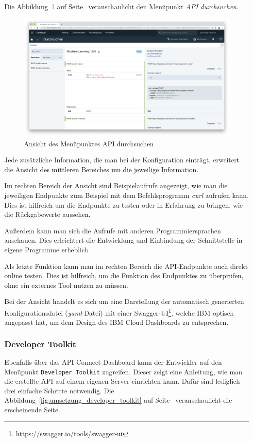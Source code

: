 Die Abbildung~\ref{fig:umsetzung_apiconnect_durchsuchen} auf Seite~\pageref{fig:umsetzung_apiconnect_durchsuchen}
veranschaulicht den Menüpunkt \textit{API durchsuchen}.

\begin{figure}[h]
    \centering
    \includegraphics[width=\textwidth]{images/kapitel_3/apiconnect_durchsuchen.png}
    \caption{Ansicht des Menüpunktes API durchsuchen}
    \label{fig:umsetzung_apiconnect_durchsuchen}
\end{figure}

Jede zusätzliche Information, die man bei der Konfiguration einträgt, erweitert die Ansicht des mittleren Bereiches
um die jeweilige Information.

Im rechten Bereich der Ansicht sind Beispielaufrufe angezeigt, wie man die jeweiligen Endpunkte zum Beispiel mit dem
Befehlsprogramm \textit{curl} aufrufen kann. Dies ist hilfreich um die Endpunkte zu testen oder in Erfahrung zu bringen,
wie die Rückgabewerte aussehen.

Außerdem kann man sich die Aufrufe mit anderen Programmiersprachen anschauen. Dies erleichtert die Entwicklung und
Einbindung der Schnittstelle in eigene Programme erheblich.

Als letzte Funktion kann man im rechten Bereich die API-Endpunkte auch direkt online testen. Dies ist hilfreich, um die
Funktion des Endpunktes zu überprüfen, ohne ein externes Tool nutzen zu müssen.

Bei der Ansicht handelt es sich um eine Darstellung der automatisch generierten Konfigurationsdatei
(\textit{yaml}-Datei) mit einer Swagger-UI\footnote{https://swagger.io/tools/swagger-ui}, welche IBM optisch angepasst
hat, um dem Design des IBM Cloud Dashboards zu entsprechen.

\subsubsection{Developer Toolkit}
Ebenfalls über das API Connect Dashboard kann der Entwickler auf den Menüpunkt \texttt{Developer Toolkit} zugreifen.
Dieser zeigt eine Anleitung, wie man die erstellte API auf einem eigenen Server einrichten kann. Dafür sind lediglich
drei einfache Schritte notwendig. Die Abbildung~\ref{fig:umsetzung_developer_toolkit} auf
Seite~\pageref{fig:umsetzung_developer_toolkit} veranschaulicht die erscheinende Seite.

